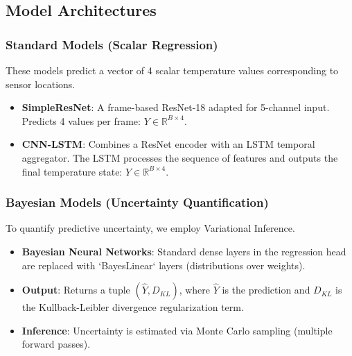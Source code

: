 \subsection{Model Architectures}

\subsubsection{Standard Models (Scalar Regression)}
These models predict a vector of 4 scalar temperature values corresponding to sensor locations.
\begin{itemize}
    \item \textbf{SimpleResNet}: A frame-based ResNet-18 adapted for 5-channel input. Predicts 4 values per frame: $Y \in \mathbb{R}^{B \times 4}$.
    \item \textbf{CNN-LSTM}: Combines a ResNet encoder with an LSTM temporal aggregator. The LSTM processes the sequence of features and outputs the final temperature state: $Y \in \mathbb{R}^{B \times 4}$.
\end{itemize}

\subsubsection{Bayesian Models (Uncertainty Quantification)}
To quantify predictive uncertainty, we employ Variational Inference.
\begin{itemize}
    \item \textbf{Bayesian Neural Networks}: Standard dense layers in the regression head are replaced with `BayesLinear` layers (distributions over weights).
    \item \textbf{Output}: Returns a tuple $(\hat{Y}, D_{KL})$, where $\hat{Y}$ is the prediction and $D_{KL}$ is the Kullback-Leibler divergence regularization term.
    \item \textbf{Inference}: Uncertainty is estimated via Monte Carlo sampling (multiple forward passes).
\end{itemize}

